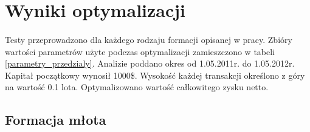 \documentclass[pdflatex,11pt]{aghdpl}
\begin{document}
\section{Wyniki optymalizacji}
\label{sec:wyniki_optymalizacji}
\paragraph{}
Testy przeprowadzono dla każdego rodzaju formacji opisanej w pracy. Zbióry wartości parametrów użyte podczas optymalizacji zamieszczono w tabeli \ref{parametry_przedzialy}. Analizie poddano okres od 1.05.2011r. do 1.05.2012r. Kapitał początkowy wynosił 1000\$. Wysokość każdej transakcji określono z góry na wartość 0.1 lota. Optymalizowano wartość całkowitego zysku netto.

\subsection{Formacja młota}
\paragraph{}
\end{document}
